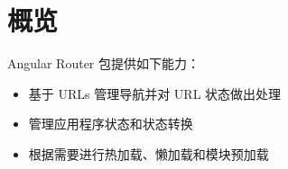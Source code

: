 \section{概览}


Angular Router 包提供如下能力：


\begin{itemize}
  \item 基于 URLs 管理导航并对 URL 状态做出处理
  \item 管理应用程序状态和状态转换
  \item 根据需要进行热加载、懒加载和模块预加载
\end{itemize}
